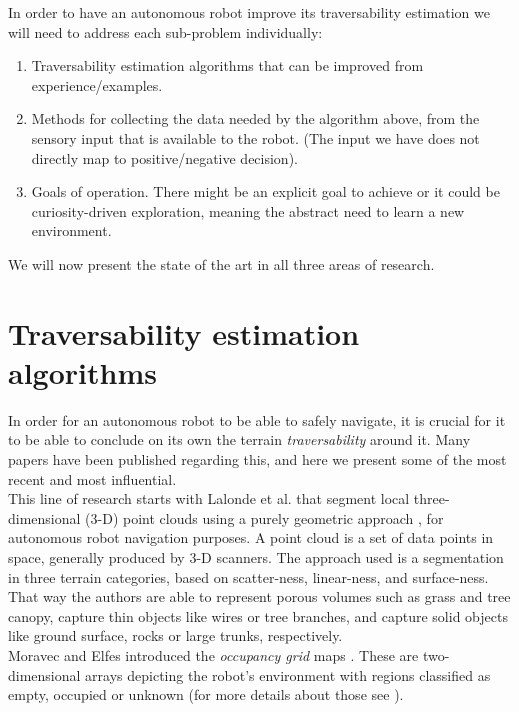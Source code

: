 \documentclass[12pt,a4paper]{report}
\newcommand{\term}{\textit}
\begin{document}
	In order to have an autonomous robot improve its traversability 
	estimation we will need to address each sub-problem individually:
	
	\begin{enumerate}
		\item Traversability estimation algorithms that can be improved from 
		experience/examples.
		\item Methods for collecting the data needed by the algorithm above, from 
		the sensory input that is available to the robot. (The input we have does not 
		directly map to positive/negative decision).
		\item Goals of operation. There might be an explicit goal to achieve or it 
		could be curiosity-driven exploration, meaning the abstract need to learn a 
		new environment.
	\end{enumerate}
	
	We will now present the state of the art in all three areas of research.
	\\
	
	\section{Traversability estimation algorithms}
	\label{sec:bg:trav}
	
	In order for an autonomous robot to be able to safely navigate, it is crucial 
	for it to be able to conclude on its own the terrain \term{traversability} 
	around it. Many papers have been published regarding this, and here we present 
	some of the most recent and most influential.
	\\
	
	This line of research starts with Lalonde et al. that segment local three-
	dimensional (3-D) point clouds using a purely geometric approach \cite{Lalonde},
	for autonomous robot navigation purposes. A point cloud is a set of data 
	points in space, generally produced by 3-D scanners. The approach used is a 
	segmentation in three terrain categories, based on scatter-ness, linear-ness, 
	and surface-ness. That way the authors are able to represent porous volumes 
	such as grass and tree canopy, capture thin objects like wires or tree 
	branches, and capture solid objects like ground surface, rocks or large 
	trunks, respectively.
	\\	
	
	
	Moravec and Elfes introduced the 
	\term{occupancy grid} maps \cite{Moravec}. These are two-dimensional arrays 
	depicting the robot’s environment with regions classified as empty, occupied 
	or unknown (for more details about those see \cite{Moravec}).
	
\end{document}
